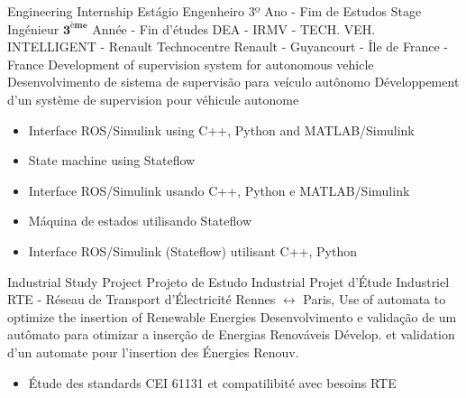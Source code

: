 \cventry{\apr\ 2018 \newline \aug\ 2018\newline}
{
  \ml%
  {Engineering Internship}
  {Estágio Engenheiro 3º Ano - Fim de Estudos}
  {Stage Ingénieur $\mathbf{3^{ème}} $ Année - Fin d'études}}
{\newline DEA - IRMV - TECH. VEH. INTELLIGENT - Renault}
{\newline Technocentre Renault - Guyancourt - Île de France - France}
{\newline
  \ml%
  {Development of supervision system for autonomous vehicle}
  {Desenvolvimento de sistema de supervisão para veículo autônomo}
  {Développement d'un système de supervision pour véhicule autonome}}
{\ml%
  {
    \begin{itemize}
    \item Interface ROS/Simulink using C++, Python and MATLAB/Simulink
    \item State machine using Stateflow
    \end{itemize}
  }
  {
    \begin{itemize}
    \item Interface ROS/Simulink usando C++, Python e MATLAB/Simulink
    \item Máquina de estados utilisando Stateflow
    \end{itemize}
  }
  {
    \begin{itemize}
    \item Interface ROS/Simulink (Stateflow) utilisant C++, Python
    \end{itemize}
}
}

\cventry{\nov\ 2017 \newline \apr\ 2018\newline}
{
  \ml%
  {Industrial Study Project}
  {Projeto de Estudo Industrial}
  {Projet d'Étude Industriel}}
{\newline RTE - Réseau de Transport d'Électricité}
{\newline Rennes $\leftrightarrow$ Paris,}
{\newline
  \ml%
  {Use of automata to optimize the insertion of Renewable Energies}
  {Desenvolvimento e validação de um autômato para otimizar a inserção
    de Energias Renováveis}
  {Dévelop. et validation d'un automate pour
    l'insertion des Énergies Renouv.}}
{
  \begin{itemize}
    \item Étude des standards CEI 61131 et compatilibité avec besoins RTE
  \end{itemize}
}

